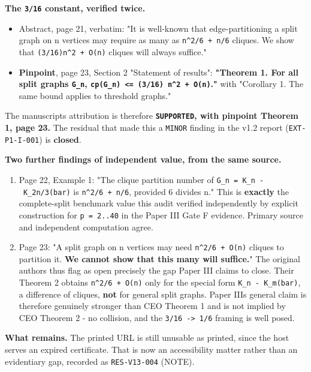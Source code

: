 \documentclass[
  9pt,
  a4paper,
]{article}
\providecommand{\tightlist}{%
  \setlength{\itemsep}{0pt}\setlength{\parskip}{0pt}}
\begin{document}
\textbf{The \texttt{3/16} constant, verified twice.}

\begin{itemize}
\tightlist
\item
  Abstract, page 21, verbatim: "It is well-known that edge-partitioning
  a split graph on n vertices may require as many as
  \texttt{n\^{}2/6\ +\ n/6} cliques. We show that
  \texttt{(3/16)n\^{}2\ +\ O(n)} cliques will always suffice."
\item
  \textbf{Pinpoint}, page 23, Section 2 "Statement of results":
  \textbf{"Theorem 1. For all split graphs \texttt{G\_n},
  \texttt{cp(G\_n)\ \textless{}=\ (3/16)\ n\^{}2\ +\ O(n)}."} with
  "Corollary 1. The same bound applies to threshold graphs."
\end{itemize}

The manuscript\textquotesingle s attribution is therefore
\textbf{\texttt{SUPPORTED}, with pinpoint Theorem 1, page 23.} The
residual that made this a \texttt{MINOR} finding in the v1.2 report
(\texttt{EXT-P1-I-001}) is \textbf{closed}.

\textbf{Two further findings of independent value, from the same
source.}

\begin{enumerate}
\def\labelenumi{\arabic{enumi}.}
\tightlist
\item
  Page 22, Example 1: "The clique partition number of
  \texttt{G\_n\ =\ K\_n\ -\ K\_2n/3(bar)} is \texttt{n\^{}2/6\ +\ n/6},
  provided 6 divides n." This is \textbf{exactly} the complete-split
  benchmark value this audit verified independently by explicit
  construction for \texttt{p\ =\ 2..40} in the Paper III Gate F
  evidence. Primary source and independent computation agree.
\item
  Page 23: "A split graph on n vertices may need
  \texttt{n\^{}2/6\ +\ O(n)} cliques to partition it. \textbf{We cannot
  show that this many will suffice.}" The original authors thus flag as
  open precisely the gap Paper III claims to close. Their Theorem 2
  obtains \texttt{n\^{}2/6\ +\ O(n)} only for the special form
  \texttt{K\_n\ -\ K\_m(bar)}, a difference of cliques, \textbf{not} for
  general split graphs. Paper III\textquotesingle s general claim is
  therefore genuinely stronger than CEO Theorem 1 and is not implied by
  CEO Theorem 2 - no collision, and the
  \texttt{3/16\ -\textgreater{}\ 1/6} framing is well posed.
\end{enumerate}

\textbf{What remains.} The printed URL is still unusable as printed,
since the host serves an expired certificate. That is now an
accessibility matter rather than an evidentiary gap, recorded as
\texttt{RES-V13-004} (NOTE).
\end{document}
